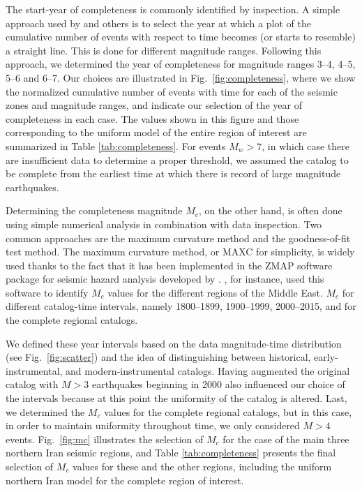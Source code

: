 The start-year of completeness is commonly identified by inspection. A simple approach used by \citet{Frankel1995} and others is to select the year at which a plot of the cumulative number of events with respect to time becomes (or starts to resemble) a straight line. This is done for different magnitude ranges. Following this approach, we determined the year of completeness for magnitude ranges 3--4, 4--5, 5--6 and 6--7. Our choices are illustrated in Fig.~\ref{fig:completeness}, where we show the normalized cumulative number of events with time for each of the seismic zones and magnitude ranges, and indicate our selection of the year of completeness in each case. The values shown in this figure and those corresponding to the uniform model of the entire region of interest are summarized in Table \ref{tab:completeness}. For events $M_w>7$, in which case there are insufficient data to determine a proper threshold, we assumed the catalog to be complete from the earliest time at which there is record of large magnitude earthquakes.

Determining the completeness magnitude $M_c$, on the other hand, is often done using simple numerical analysis in combination with data inspection. Two common approaches are the maximum curvature method and the goodness-of-fit test method. The maximum curvature method, or MAXC for simplicity, is widely used thanks to the fact that it has been implemented in the ZMAP software package for seismic hazard analysis developed by \citet{Wiemer2001}. \citet{Zare2014}, for instance, used this software to identify $M_c$ values for the different regions of the Middle East.  $M_c$ for different catalog-time intervals, namely 1800--1899, 1900--1999, 2000--2015, and for the complete regional catalogs.

We defined these year intervals based on the data magnitude-time distribution (see Fig.~\ref{fig:scatter}) and the idea of distinguishing between historical, early-instrumental, and modern-instrumental catalogs. Having augmented the original catalog with $M>3$ earthquakes beginning in 2000 also influenced our choice of the intervals because at this point the uniformity of the catalog is altered. Last, we determined the $M_c$ values for the complete regional catalogs, but in this case, in order to maintain uniformity throughout time, we only considered $M>4$ events.  Fig.~\ref{fig:mc} illustrates the selection of $M_c$ for the case of the main three northern Iran seismic regions, and Table \ref{tab:completeness} presents the final selection of $M_c$ values for these and the other regions, including the uniform northern Iran model for the complete region of interest.

